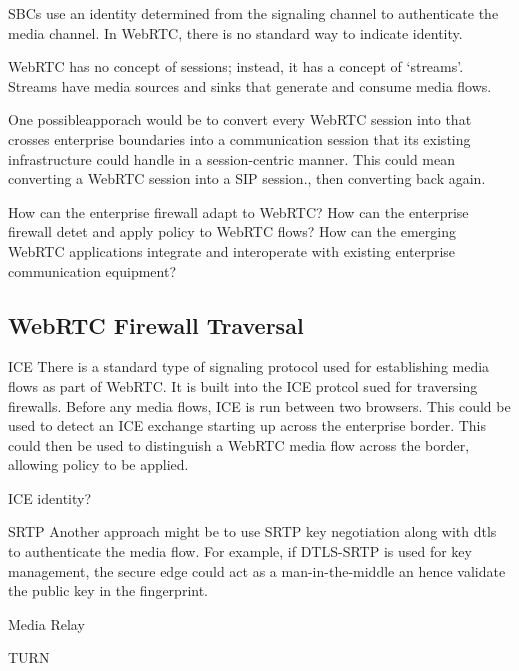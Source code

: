 SBCs use an identity determined from the signaling channel to authenticate the media channel. In WebRTC, there is no standard way to indicate identity. 

WebRTC has no concept of sessions; instead, it has a concept of `streams'. Streams have media sources and sinks that generate and consume media flows. 

One possibleapporach would be to convert every WebRTC session into that crosses enterprise boundaries into a communication session that its existing infrastructure could handle in a session-centric manner. This could mean converting a WebRTC session into a SIP session., then converting back again.

How can the enterprise firewall adapt to WebRTC?
How can the enterprise firewall detet and apply policy to WebRTC flows?
How can the emerging WebRTC applications integrate and interoperate with existing enterprise communication equipment?

\subsection{WebRTC Firewall Traversal}


ICE
There is a standard type of signaling protocol used for establishing media flows as part of WebRTC. It is built into the ICE protcol sued for traversing firewalls. Before any media flows, ICE is run between two browsers. This could be used to detect an ICE exchange starting up across the enterprise border. This could then be used to distinguish a WebRTC media flow across the border, allowing policy to be applied.

ICE identity?

SRTP
Another approach might be to use SRTP key negotiation along with \gls{dtls} to authenticate the media flow. For example, if DTLS-SRTP is used for key management, the secure edge could act as a man-in-the-middle an hence validate the public key in the fingerprint. 


Media Relay

TURN